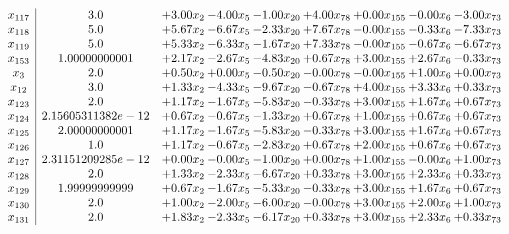 \documentclass[8pt]{article}
\begin{document}
\[\begin{array}{c| c c@{\hskip 2pt} c@{\hskip 2pt} c@{\hskip 2pt} c@{\hskip 2pt} c@{\hskip 2pt} c@{\hskip 2pt} c@{\hskip 2pt} }
 x_{117}   &  3.0 & +  3.00 x_{2} & -4.00 x_{5} & -1.00 x_{20} & +  4.00 x_{78} & +  0.00 x_{155} & -0.00 x_{6} & -3.00 x_{73}\\
 x_{118}   &  5.0 & +  5.67 x_{2} & -6.67 x_{5} & -2.33 x_{20} & +  7.67 x_{78} & -0.00 x_{155} & -0.33 x_{6} & -7.33 x_{73}\\
 x_{119}   &  5.0 & +  5.33 x_{2} & -6.33 x_{5} & -1.67 x_{20} & +  7.33 x_{78} & -0.00 x_{155} & -0.67 x_{6} & -6.67 x_{73}\\
 x_{153}   &  1.00000000001 & +  2.17 x_{2} & -2.67 x_{5} & -4.83 x_{20} & +  0.67 x_{78} & +  3.00 x_{155} & +  2.67 x_{6} & -0.33 x_{73}\\
 x_{3}   &  2.0 & +  0.50 x_{2} & +  0.00 x_{5} & -0.50 x_{20} & -0.00 x_{78} & -0.00 x_{155} & +  1.00 x_{6} & +  0.00 x_{73}\\
 x_{12}   &  3.0 & +  1.33 x_{2} & -4.33 x_{5} & -9.67 x_{20} & -0.67 x_{78} & +  4.00 x_{155} & +  3.33 x_{6} & +  0.33 x_{73}\\
 x_{123}   &  2.0 & +  1.17 x_{2} & -1.67 x_{5} & -5.83 x_{20} & -0.33 x_{78} & +  3.00 x_{155} & +  1.67 x_{6} & +  0.67 x_{73}\\
 x_{124}   &  2.15605311382e-12 & +  0.67 x_{2} & -0.67 x_{5} & -1.33 x_{20} & +  0.67 x_{78} & +  1.00 x_{155} & +  0.67 x_{6} & +  0.67 x_{73}\\
 x_{125}   &  2.00000000001 & +  1.17 x_{2} & -1.67 x_{5} & -5.83 x_{20} & -0.33 x_{78} & +  3.00 x_{155} & +  1.67 x_{6} & +  0.67 x_{73}\\
 x_{126}   &  1.0 & +  1.17 x_{2} & -0.67 x_{5} & -2.83 x_{20} & +  0.67 x_{78} & +  2.00 x_{155} & +  0.67 x_{6} & +  0.67 x_{73}\\
 x_{127}   &  2.31151209285e-12 & +  0.00 x_{2} & -0.00 x_{5} & -1.00 x_{20} & +  0.00 x_{78} & +  1.00 x_{155} & -0.00 x_{6} & +  1.00 x_{73}\\
 x_{128}   &  2.0 & +  1.33 x_{2} & -2.33 x_{5} & -6.67 x_{20} & +  0.33 x_{78} & +  3.00 x_{155} & +  2.33 x_{6} & +  0.33 x_{73}\\
 x_{129}   &  1.99999999999 & +  0.67 x_{2} & -1.67 x_{5} & -5.33 x_{20} & -0.33 x_{78} & +  3.00 x_{155} & +  1.67 x_{6} & +  0.67 x_{73}\\
 x_{130}   &  2.0 & +  1.00 x_{2} & -2.00 x_{5} & -6.00 x_{20} & -0.00 x_{78} & +  3.00 x_{155} & +  2.00 x_{6} & +  1.00 x_{73}\\
 x_{131}   &  2.0 & +  1.83 x_{2} & -2.33 x_{5} & -6.17 x_{20} & +  0.33 x_{78} & +  3.00 x_{155} & +  2.33 x_{6} & +  0.33 x_{73}\\

\end{array}\]
\end{document}
